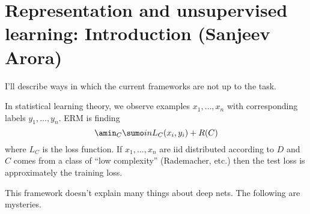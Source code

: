 \section{Representation and unsupervised learning: Introduction (Sanjeev Arora)}

I'll describe ways in which the current frameworks are not up to the task.

In statistical learning theory, we observe examples $x_1,\ldots, x_n$ with corresponding labels $y_1,\ldots, y_n$. ERM is finding
$$
\amin_C \sumo in L_C(x_i,y_i) + R(C)
$$
where $L_C$ is the loss function. If $x_1,\ldots, x_n$ are iid distributed according to $D$ and $C$ comes from a class of ``low complexity'' (Rademacher, etc.) then the test loss is approximately the training loss.

This framework doesn't explain many things about deep nets. The following are mysteries.
